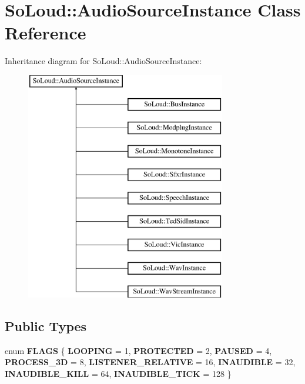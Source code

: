 \hypertarget{class_so_loud_1_1_audio_source_instance}{}\section{So\+Loud\+:\+:Audio\+Source\+Instance Class Reference}
\label{class_so_loud_1_1_audio_source_instance}
Inheritance diagram for So\+Loud\+:\+:Audio\+Source\+Instance\+:\begin{figure}[H]
\begin{center}
\leavevmode
\includegraphics[height=10.000000cm]{class_so_loud_1_1_audio_source_instance}
\end{center}
\end{figure}
\subsection*{Public Types}
\begin{DoxyCompactItemize}
\item 
\mbox{\label{class_so_loud_1_1_audio_source_instance_a32c4206e75224bff3a904f300bcccc1d}} 
enum {\bfseries F\+L\+A\+GS} \{ \newline
{\bfseries L\+O\+O\+P\+I\+NG} = 1, 
{\bfseries P\+R\+O\+T\+E\+C\+T\+ED} = 2, 
{\bfseries P\+A\+U\+S\+ED} = 4, 
{\bfseries P\+R\+O\+C\+E\+S\+S\+\_\+3D} = 8, 
\newline
{\bfseries L\+I\+S\+T\+E\+N\+E\+R\+\_\+\+R\+E\+L\+A\+T\+I\+VE} = 16, 
{\bfseries I\+N\+A\+U\+D\+I\+B\+LE} = 32, 
{\bfseries I\+N\+A\+U\+D\+I\+B\+L\+E\+\_\+\+K\+I\+LL} = 64, 
{\bfseries I\+N\+A\+U\+D\+I\+B\+L\+E\+\_\+\+T\+I\+CK} = 128
 \}
\end{DoxyCompactItemize}
